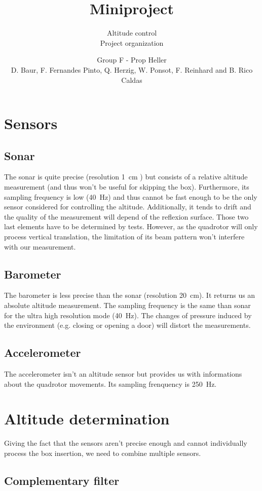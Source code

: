 \documentclass{repMobRob}
\author{Group F - Prop Heller \\ D. Baur, F. Fernandes Pinto, Q. Herzig, W. Ponsot, F. Reinhard and B. Rico Caldas}
\title{Miniproject}
\subtitle{Altitude control \\ \small{Project organization}}
\begin{document}
\thispagestyle{empty}
\maketitle

\section{Sensors}
\subsection{Sonar}
The sonar is quite precise (resolution \SI{1}{\centi\meter} ) but consists of a relative altitude measurement (and thus won’t be useful for skipping the box). Furthermore, its sampling frequency is low (\SI{40}{\hertz}) and thus cannot be fast enough to be the only sensor considered for controlling the altitude. Additionally, it tends to drift and the quality of the measurement will depend of the reflexion surface. Those two last elements have to be determined by tests. However, as the quadrotor will only process vertical translation, the limitation of its beam pattern won’t interfere with our measurement.

\subsection{Barometer}
The barometer is less precise than the sonar (resolution \SI{20}{\centi\meter}). It returns us an absolute altitude measurement. The sampling frequency is the same than sonar for the ultra high resolution mode (\SI{40}{\hertz}). The changes of pressure induced by the environment (e.g. closing or opening a door) will distort the measurements.

\subsection{Accelerometer}
The accelerometer isn't an altitude sensor but provides us with informations about the quadrotor movements. Its sampling frenquency is \SI{250}{\hertz}. 

\section{Altitude determination}
Giving the fact that the sensors aren’t precise enough and cannot individually process the box insertion, we need to combine multiple sensors. 

\subsection{Complementary filter}
\end{document}
